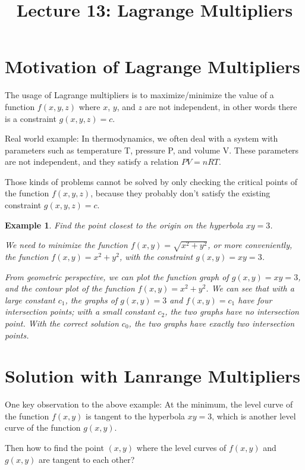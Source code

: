 \documentclass{article}
\title{Lecture 13: Lagrange Multipliers}
\author{}
\date{}
\newtheorem{example}{Example}
\begin{document}
    
\maketitle

\section{Motivation of Lagrange Multipliers}

The usage of Lagrange multipliers is to maximize/minimize the value of a 
function $f(x, y, z)$ where $x$, $y$, and $z$ are not independent, in other 
words there is a constraint $g(x, y, z) = c$.

Real world example: In thermodynamics, we often deal with a system with 
parameters such as temperature T, pressure P, and volume V. These parameters are 
not independent, and they satisfy a relation $PV = nRT$.

Those kinds of problems cannot be solved by only checking the critical points of 
the function $f(x, y, z)$, because they probably don't satisfy the existing 
constraint $g(x, y, z) = c$.

\begin{example}
  Find the point closest to the origin on the hyperbola $xy = 3$.

  We need to minimize the function $f(x, y) = \sqrt{x^2 + y^2}$, or more 
  conveniently, the function $f(x, y) = x^2 + y^2$, with the constraint 
  $g(x, y) = xy = 3$.

  From geometric perspective, we can plot the function graph of 
  $g(x, y) = xy = 3$, and the contour plot of the function 
  $f(x, y) = x^2 + y^2$. We can see that with a large constant $c_1$, the graphs 
  of $g(x, y) = 3$ and $f(x, y) = c_1$ have four intersection points; with a 
  small constant $c_2$, the two graphs have no intersection point. With the 
  correct solution $c_0$, the two graphs have exactly two intersection points.
\end{example}

\section{Solution with Lanrange Multipliers}

One key observation to the above example: At the minimum, the level curve of the 
function $f(x, y)$ is tangent to the hyperbola $xy = 3$, which is another level 
curve of the function $g(x, y)$.

Then how to find the point $(x, y)$ where the level curves of $f(x, y)$ and 
$g(x, y)$ are tangent to each other?
\end{document}
